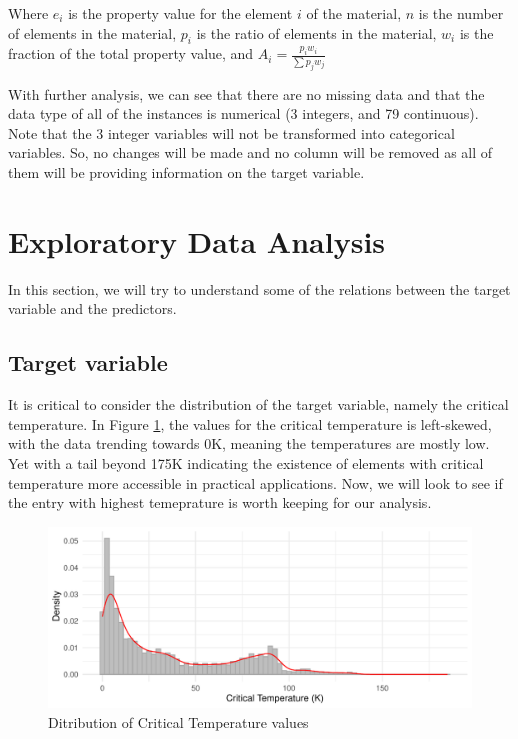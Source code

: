 \documentclass{article}\usepackage[]{graphicx}\usepackage[]{xcolor}
\makeatletter
\def\maxwidth{ %
  \ifdim\Gin@nat@width>\linewidth
    \linewidth
  \else
    \Gin@nat@width
  \fi
}
\newenvironment{knitrout}{}{} %
\makeatother
\begin{document}
Where $e_i$ is the property value for the element $i$ of the material, $n$ is the number of elements in the material, $p_i$ is the ratio of elements in the material, $w_i$ is the fraction of the total property value, and $A_i = \frac{p_iw_i}{\sum{p_jw_j}}$


With further analysis, we can see that there are no missing data and that the data type of all of the instances is numerical (3 integers, and 79 continuous). Note that the 3 integer variables will not be transformed into categorical variables. So, no changes will be made and no column will be removed as all of them will be providing information on the target variable.



\section{Exploratory Data Analysis}
In this section, we will try to understand some of the relations between the target variable and the predictors.

\subsection{Target variable}
It is critical to consider the distribution of the target variable, namely the critical temperature. In Figure \ref{histo}, the values for the critical temperature is left-skewed, with the data trending towards 0K, meaning the temperatures are mostly low. Yet with a tail beyond 175K indicating the existence of elements with critical temperature more accessible in practical applications. Now, we will look to see if the entry with highest temeprature is worth keeping for our analysis.

\begin{figure}[h!]
\begin{knitrout}
\color{fgcolor}

{\centering \includegraphics[width=\maxwidth]{figure/unnamed-chunk-3-1} 

}


\end{knitrout}
\caption{Ditribution of Critical Temperature values}
\label{histo}
\end{figure}
\end{document}

